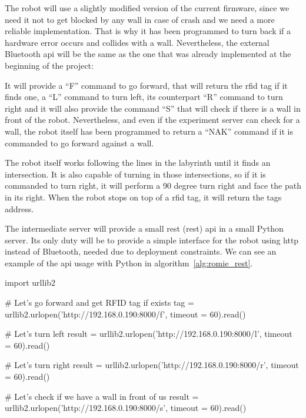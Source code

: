 The robot will use a slightly modified version of the current firmware, since we need it not to get
blocked by any wall in case of crash and we need a more reliable implementation. That is why it has
been programmed to turn back if a hardware error occurs and collides with a wall. Nevertheless, the
external Bluetooth \acrshort{api} will be the same as the one that was already implemented at the
beginning of the project:

It will provide a ``F'' command to go forward, that will return the \acrshort{rfid} tag if it finds
one, a ``L'' command to turn left, its counterpart ``R'' command to turn right and it will also
provide the command ``S'' that will check if there is a wall in front of the robot. Nevertheless,
and even if the experiment server can check for a wall, the robot itself has been programmed to
return a ``NAK'' command if it is commanded to go forward against a wall.

The robot itself works following the lines in the labyrinth until it finds an intersection. It is
also capable of turning in those intersections, so if it is commanded to turn right, it will perform
a 90 degree turn right and face the path in its right. When the robot stops on top of a
\acrshort{rfid} tag, it will return the tags address.

The intermediate server will provide a small \acrlong{rest} (\acrshort{rest}) \acrshort{api} in a
small Python server. Its only duty will be to provide a simple interface for the robot using
\acrshort{http} instead of Bluetooth, needed due to deployment constraints. We can see an example of
the \acrshort{api} usage with Python in algorithm~\ref{alg:romie_rest}.

\begin{center}
\begin{minipage}{.9\textwidth}
\singlespace
{}
\begin{pyglist}[language=python, caption={Romie \acrshort{rest} \acrshort{api} example.},
	label={alg:romie_rest}, listingname={Algorithm}, numbers=left]
import urllib2

# Let's go forward and get RFID tag if exists
tag = urllib2.urlopen('http://192.168.0.190:8000/f',
    timeout = 60).read()

# Let's turn left
result = urllib2.urlopen('http://192.168.0.190:8000/l',
    timeout = 60).read()

# Let's turn right
result = urllib2.urlopen('http://192.168.0.190:8000/r',
    timeout = 60).read()

# Let's check if we have a wall in front of us
result = urllib2.urlopen('http://192.168.0.190:8000/s',
    timeout = 60).read()
\end{pyglist}
\end{minipage}
\end{center}

